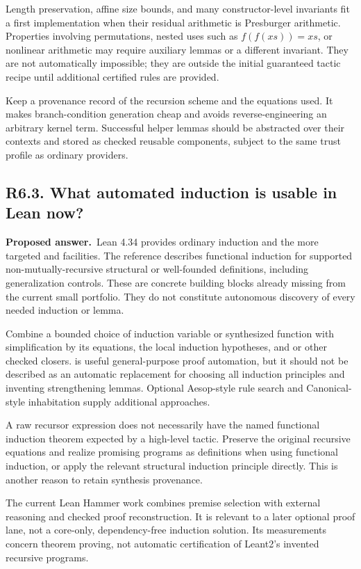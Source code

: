 \documentclass[11pt,a4paper]{article}
\newcommand{\code}[1]{\texttt{\small\detokenize{#1}}}
\newcommand{\question}[2]{\subsection{#1. #2}\label{q:#1}}
\newcommand{\answer}{\textbf{Proposed answer.}\ }
\theoremstyle{remark}
\begin{document}
Length preservation, affine size bounds, and many constructor-level
invariants fit a first implementation when their residual arithmetic is
Presburger arithmetic. Properties involving permutations, nested uses such
as $f(f(xs))=xs$, or nonlinear arithmetic may require auxiliary lemmas or a
different invariant. They are not automatically impossible; they are outside
the initial guaranteed tactic recipe until additional certified rules are
provided.

Keep a provenance record of the recursion scheme and the equations used.
It makes branch-condition generation cheap and avoids reverse-engineering
an arbitrary kernel term. Successful helper lemmas should be abstracted over
their contexts and stored as checked reusable components, subject to the
same trust profile as ordinary providers.

\question{R6.3}{What automated induction is usable in Lean now?}

\answer Lean 4.34 provides ordinary induction and the more targeted
\code{fun_induction} and \code{fun_cases} facilities. The reference describes
functional induction for supported non-mutually-recursive structural or
well-founded definitions, including generalization controls. These are
concrete building blocks already missing from the current small portfolio.
They do not constitute autonomous discovery of every needed induction or
lemma.\cite{leanmanual}

Combine a bounded choice of induction variable or synthesized function with
simplification by its equations, the local induction hypotheses, and
\code{omega} or other checked closers. \code{grind} is useful general-purpose
proof automation, but it should not be described as an automatic replacement
for choosing all induction principles and inventing strengthening lemmas.
Optional Aesop-style rule search and Canonical-style inhabitation supply
additional approaches.\cite{aesop,canonical}

A raw recursor expression does not necessarily have the named functional
induction theorem expected by a high-level tactic. Preserve the original
recursive equations and realize promising programs as definitions when
using functional induction, or apply the relevant structural induction
principle directly. This is another reason to retain synthesis provenance.

The current Lean Hammer work combines premise selection with external
reasoning and checked proof reconstruction. It is relevant to a later
optional proof lane, not a core-only, dependency-free induction solution.
Its measurements concern theorem proving, not automatic certification of
Leant2's invented recursive programs.\cite{leanhammer}
\end{document}
